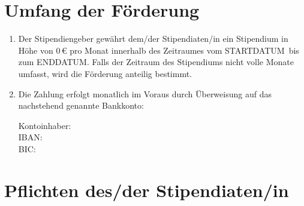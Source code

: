 \documentclass[
  paper=a4,
  fontsize=12pt,
  DIV=16,
  parskip=full,
  headinclude=true,
]{scrartcl}
\newcommand\stipbetrag{0}		%
\newcommand\stipstart{STARTDATUM}	%
\newcommand\stipende{ENDDATUM}		%
\newcommand\stipkontoinhaber{}		%
\newcommand\stipbic{}			%
\newcommand\stipiban{}			%
\begin{document}
\section{Umfang der Förderung}

\begin{enumerate}[\qquad(1)]
	\item Der Stipendiengeber gewährt dem/der Stipendiaten/in ein
		Stipendium in Höhe von \num{\stipbetrag}\,€ pro Monat innerhalb
		des Zeitraumes vom \stipstart\ bis zum \stipende.
		Falls der Zeitraum des Stipendiums nicht volle Monate umfasst,
		wird die Förderung anteilig bestimmt.
	\item Die Zahlung erfolgt monatlich im Voraus durch Überweisung auf
		das nachstehend genannte Bankkonto:

		Kontoinhaber: \stipkontoinhaber\\
		IBAN: \stipiban\\
		BIC: \stipbic\\
\end{enumerate}

\section{Pflichten des/der Stipendiaten/in}
\end{document}
